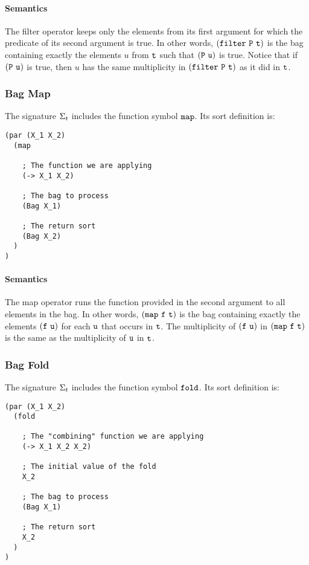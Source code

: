 \documentclass[english,a4paper,10pt]{article}
\begin{document}
\paragraph{Semantics}
The filter operator keeps only the elements
from its first argument
for which the predicate of its second argument is true.
In other words,
$\syntax{(filter\ P\ t)}$
is the bag containing exactly
the elements $u$ from ${\tt t}$
such that ${\tt (P\ u)}$ is true.
Notice that if ${\tt (P\ u)}$ is true,
then $u$ has the same multiplicity in $\syntax{(filter\ P\ t)}$
as it did in ${\tt t}$.

\subsubsection{Bag Map}
The signature $\Sigma_{t}$ includes 
the function symbol ${\tt map}$. Its sort definition is:

\begin{verbatim}
(par (X_1 X_2)
  (map
    
    ; The function we are applying
    (-> X_1 X_2)
  
    ; The bag to process
    (Bag X_1)
    
    ; The return sort
    (Bag X_2)
  )
)
\end{verbatim}

\paragraph{Semantics}
The map operator runs the function provided
in the second argument to all elements in the bag.
In other words,
${\tt (map\ f\ t)}$
is the bag containing exactly
the elements ${\tt (f\ u)}$
for each ${\tt u}$ that occurs in ${\tt t}$.
The multiplicity of ${\tt (f\ u)}$
in ${\tt (map\ f\ t)}$
is the same as the multiplicity of ${\tt u}$ in ${\tt t}$.

\subsubsection{Bag Fold}
\label{sec:fold}
The signature $\Sigma_{t}$ includes 
the function symbol ${\tt fold}$. Its sort definition is:

\begin{verbatim}
(par (X_1 X_2)
  (fold
    
    ; The "combining" function we are applying
    (-> X_1 X_2 X_2)
    
    ; The initial value of the fold
    X_2
  
    ; The bag to process
    (Bag X_1)
    
    ; The return sort
    X_2
  )
)
\end{verbatim}
\end{document}
